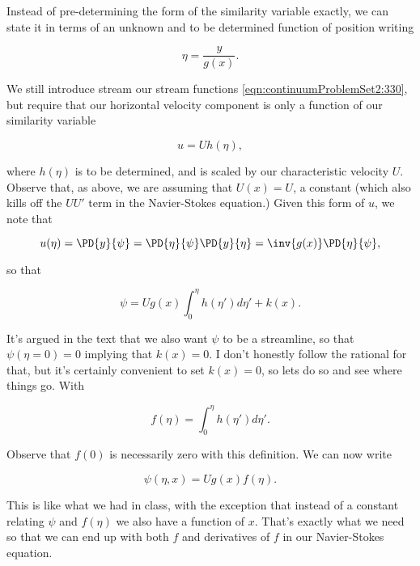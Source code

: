 Instead of pre-determining the form of the similarity variable exactly, we can state it in terms of an unknown and to be determined function of position writing

\begin{equation}\label{eqn:continuumL19:770}
\eta = \frac{y}{g(x)}.
\end{equation}

We still introduce stream our stream functions \ref{eqn:continuumProblemSet2:330}, but require that our horizontal velocity component is only a function of our similarity variable

\begin{equation}\label{eqn:continuumL19:790}
u = U h(\eta),
\end{equation}

where $h(\eta)$ is to be determined, and is scaled by our characteristic velocity $U$.  Observe that, as above, we are assuming that $U(x) = U$, a constant (which also kills off the $U U'$ term in the Navier-Stokes equation.)  Given this form of $u$, we note that 

\begin{equation}\label{eqn:continuumL19:810}
u(\eta) = \PD{y}{\psi} = \PD{\eta}{\psi} \PD{y}{\eta} = \inv{g(x)} \PD{\eta}{\psi},
\end{equation}

so that

\begin{equation}\label{eqn:continuumL19:830}
\psi = U g(x) \int_0^\eta h(\eta') d\eta' + k(x).
\end{equation}

It's argued in the text that we also want $\psi$ to be a streamline, so that $\psi(\eta = 0) = 0$ implying that $k(x) = 0$.  I don't honestly follow the rational for that, but it's certainly convenient to set $k(x) = 0$, so lets do so and see where things go.  With

\begin{equation}\label{eqn:continuumL19:850}
f(\eta) = \int_0^\eta h(\eta') d\eta'.
\end{equation}

Observe that $f(0)$ is necessarily zero with this definition.  We can now write

\begin{equation}\label{eqn:continuumL19:870}
\psi(\eta, x) = U g(x) f(\eta).
\end{equation}

This is like what we had in class, with the exception that instead of a constant relating $\psi$ and $f(\eta)$ we also have a function of $x$.  That's exactly what we need so that we can end up with both $f$ and derivatives of $f$ in our Navier-Stokes equation.  

